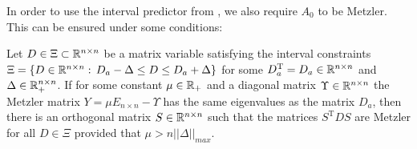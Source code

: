 \documentclass{article}
\begin{document}
In order to use the interval predictor from \citep{leurent2019interval}, we also require $A_0$ to be Metzler. This can be ensured under some conditions:

\begin{lemma}
\label{lem:metzler} Let $D\in\Xi\subset\mathbb{R}^{n\times n}$ be a matrix variable satisfying the interval constraints $\Xi=\{D\in\mathbb{R}^{n\times n}:\,D_{a}-\Delta\le D\le D_{a}+\Delta\}$ for some $D_{a}^{\text{T}}=D_{a}\in\mathbb{R}^{n\times n}$ and $\Delta\in\mathbb{R}_{+}^{n\times n}$. If for some constant $\mu\in\mathbb{R}_{+}$ and a diagonal matrix $\Upsilon\in\mathbb{R}^{n\times n}$ the Metzler matrix $Y=\mu E_{n\times n}-\Upsilon$ has the same eigenvalues as the matrix $D_{a}$, then there is an orthogonal matrix $S\in\mathbb{R}^{n\times n}$ such that the matrices $S^{\text{T}}DS$ are Metzler for all $D\in\Xi$ provided that $\mu>n||\Delta||_{max}$.\textup{ }
\end{lemma}
\end{document}

